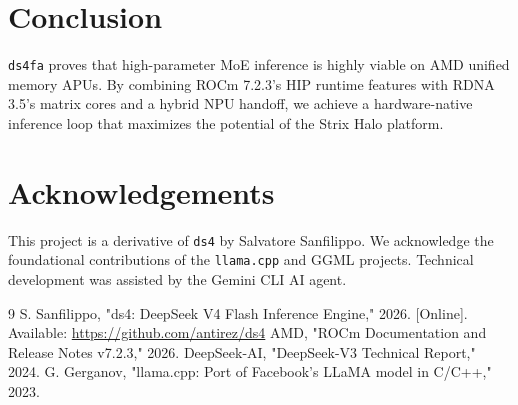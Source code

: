 \documentclass[twocolumn,10pt]{article}
\begin{document}
\section{Conclusion}
\texttt{ds4fa} proves that high-parameter MoE inference is highly viable on AMD unified memory APUs. By combining ROCm 7.2.3's HIP runtime features with RDNA 3.5's matrix cores and a hybrid NPU handoff, we achieve a hardware-native inference loop that maximizes the potential of the Strix Halo platform.

\section{Acknowledgements}
This project is a derivative of \texttt{ds4} by Salvatore Sanfilippo. We acknowledge the foundational contributions of the \texttt{llama.cpp} and GGML projects. Technical development was assisted by the Gemini CLI AI agent.

\begin{thebibliography}{9}
 S. Sanfilippo, "ds4: DeepSeek V4 Flash Inference Engine," 2026. [Online]. Available: \url{https://github.com/antirez/ds4}
 AMD, "ROCm Documentation and Release Notes v7.2.3," 2026.
 DeepSeek-AI, "DeepSeek-V3 Technical Report," 2024.
 G. Gerganov, "llama.cpp: Port of Facebook's LLaMA model in C/C++," 2023.
\end{thebibliography}
\end{document}
